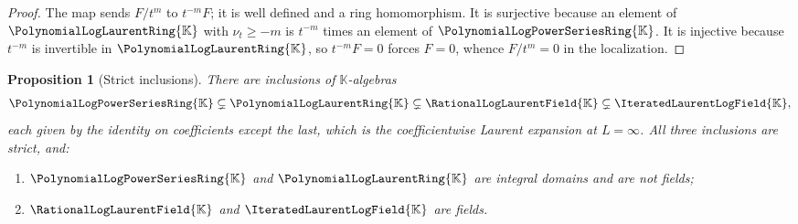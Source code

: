 \documentclass[11pt,oneside]{article}
\theoremstyle{plain}
\newtheorem{proposition}[theorem]{Proposition}
\theoremstyle{definition}
\theoremstyle{remark}
\newcommand{\K}{\mathbb{K}}
\newcommand{\PLpow}{\PolynomialLogPowerSeriesRing{\K}}   %
\newcommand{\PLlau}{\PolynomialLogLaurentRing{\K}}       %
\newcommand{\PLrat}{\RationalLogLaurentField{\K}}        %
\newcommand{\PLit}{\IteratedLaurentLogField{\K}}         %
\newcommand{\ordt}{\nu_{t}}                              %
\begin{document}
\begin{proof}
The map sends \(F/t^m\) to \(t^{-m}F\); it is well defined and a ring
homomorphism.  It is surjective because an element of \(\PLlau\) with
\(\ordt\ge -m\) is \(t^{-m}\) times an element of \(\PLpow\).  It is injective
because \(t^{-m}\) is invertible in \(\PLlau\), so \(t^{-m}F=0\) forces
\(F=0\), whence \(F/t^m=0\) in the localization.
\end{proof}

\begin{proposition}[Strict inclusions]
\label{plt:prop:ring-chain}
There are inclusions of \(\K\)-algebras
\begin{equation}\label{plt:eq:ring-chain}
  \PLpow\subsetneq\PLlau\subsetneq\PLrat\subsetneq\PLit,
\end{equation}
each given by the identity on coefficients except the last, which is the
coefficientwise Laurent expansion at \(L=\infty\).
All three inclusions are
strict, and:
\begin{enumerate}[label=\textup{(\roman*)}]
\item \(\PLpow\) and \(\PLlau\) are integral domains and are not fields;
\item \(\PLrat\) and \(\PLit\) are fields.
\end{enumerate}
\end{proposition}
\end{document}
